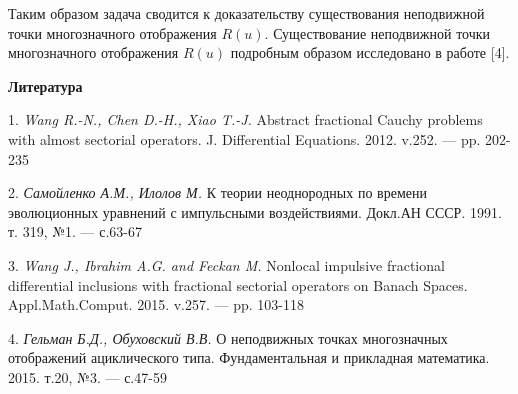 Таким образом задача сводится к доказательству существования неподвижной точки многозначного отображения $R(u)$. Существование неподвижной точки многозначного отображения $R(u)$ подробным образом исследовано в работе [4].










\smallskip \centerline {\bf Литература} \nopagebreak

1. {\it Wang R.-N., Chen D.-H., Xiao T.-J.} Abstract fractional Cauchy problems with almost sectorial operators. J. Differential Equations. 2012. v.252. — pp. 202-235

2. {\it Самойленко А.М., Илолов М.} К теории неоднородных по времени эволюционных уравнений с импульсными воздействиями. Докл.АН СССР. 1991. т. 319, №1. — с.63-67

3. {\it Wang J., Ibrahim A.G. and Feckan M.} Nonlocal impulsive fractional differential inclusions with fractional sectorial operators on Banach Spaces. Appl.Math.Comput. 2015. v.257. — pp. 103-118

4. {\it Гельман Б.Д., Обуховский В.В.} О неподвижных точках многозначных отображений ациклического типа. Фундаментальная и прикладная математика. 2015. т.20, №3. — с.47-59

